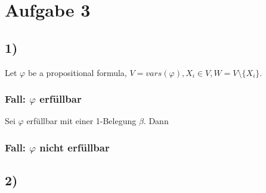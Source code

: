 \section*{Aufgabe 3}

\subsection*{1)}

Let $\varphi$ be a propositional formula, $V = vars(\varphi),X_i \in V, W = V \setminus \{X_i\}$.

\subsubsection*{Fall: $\varphi$ erfüllbar}
Sei $\varphi$ erfüllbar mit einer 1-Belegung $\beta$.
Dann 

\subsubsection*{Fall: $\varphi$ nicht erfüllbar}

\subsection*{2)}